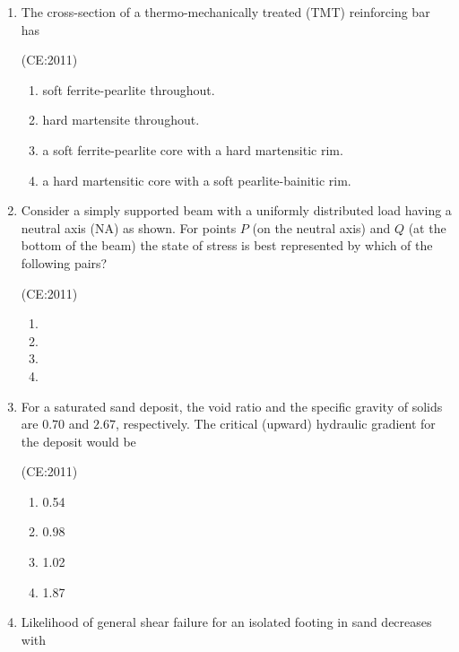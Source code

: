 \documentclass[journal,12pt,onecolumn]{IEEEtran}
\theoremstyle{remark}
\begin{document}
\begin{enumerate}
    \item 
	    The cross-section of a thermo-mechanically treated (TMT) reinforcing bar has

	    \hfill (CE:2011)
            \begin{enumerate}
            \item soft ferrite-pearlite throughout.
            \item hard martensite throughout.
            \item a soft ferrite-pearlite core with a hard martensitic rim.
            \item a hard martensitic core with a soft pearlite-bainitic rim.
        \end{enumerate}
    
    \item
	    Consider a simply supported beam with a uniformly distributed load having a neutral axis (NA) as shown. For points $P$ (on the neutral axis) and $Q$ (at the bottom of the beam) the state of stress is best represented by which of the following pairs? 

	    \begin{center}
		    
	    \end{center}

	    \hfill {(CE:2011)}
	    \begin{multicols}{2}
        \begin{enumerate}
	    \item 
	    \item  
	    \item  
	    \item  
        \end{enumerate}
	    \end{multicols}
	    
\item For a saturated sand deposit, the void ratio and the specific gravity of solids are $0.70$ and $2.67$, respectively. The critical (upward) hydraulic gradient for the deposit would be

    \hfill{(CE:2011)}
    \begin{multicols}{4}
        \begin{enumerate}
            \item 0.54
            \item 0.98
            \item 1.02
            \item 1.87
        \end{enumerate}
    \end{multicols}
    \vspace{1cm}
    \item Likelihood of general shear failure for an isolated footing in sand decreases with


\end{enumerate}
\end{document}
